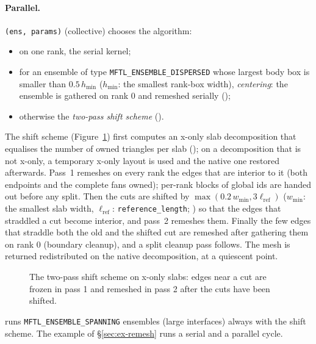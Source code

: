 \paragraph{Parallel.}
\label{sec:parallel-remesh}
\texttt{(ens, params)} (collective) chooses the algorithm:
\begin{itemize}
  \item on one rank, the serial kernel;
  \item for an ensemble of type \texttt{MFTL\_ENSEMBLE\_DISPERSED} whose largest body box is
    smaller than $0.5\,h_{\min}$ ($h_{\min}$: the smallest rank-box width), \emph{centering}:
    the ensemble is gathered on rank 0 and remeshed serially
    ();
  \item otherwise the \mftlone{} \emph{two-pass shift scheme}
    ().
\end{itemize}
The shift scheme (Figure~\ref{fig:shift}) first computes an x-only slab decomposition that
equalises the number of owned triangles per slab (); on a
decomposition that is not x-only, a temporary x-only layout is used and the native one restored
afterwards. Pass~1 remeshes on every rank the edges that are interior to it (both endpoints and
the complete fans owned); per-rank blocks of global ids are handed out before any split. Then
the cuts are shifted by $\max(0.2\,w_{\min},3\ell_{\text{ref}})$ ($w_{\min}$: the smallest slab
width, $\ell_{\text{ref}}$: \texttt{reference\_length}; ) so that the
edges that straddled a cut become interior, and pass~2 remeshes them. Finally the few edges
that straddle both the old and the shifted cut are remeshed after gathering them on rank 0
(boundary cleanup), and a split cleanup pass follows. The mesh is returned redistributed on the
native decomposition, at a quiescent point.

\begin{figure}[ht]
\centering
{}
\caption{The two-pass shift scheme on x-only slabs: edges near a cut are frozen in pass 1 and
remeshed in pass 2 after the cuts have been shifted.}
\label{fig:shift}
\end{figure}

 runs \texttt{MFTL\_ENSEMBLE\_SPANNING} ensembles (large interfaces)
always with the shift scheme. The example of \S\ref{sec:ex-remesh} runs a serial and a parallel
cycle.
